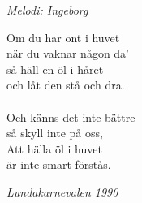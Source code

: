 {\footnotesize\textit{Melodi: Ingeborg}}\par
\vspace{10pt}
Om du har ont i huvet\\
när du vaknar någon da'\\
så häll en öl i håret\\
och låt den stå och dra.\\
\\
Och känns det inte bättre\\
så skyll inte på oss,\\
Att hälla öl i huvet\\
är inte smart förstås.
\par
\vspace{10pt}
{\footnotesize\textit{Lundakarnevalen 1990}}
